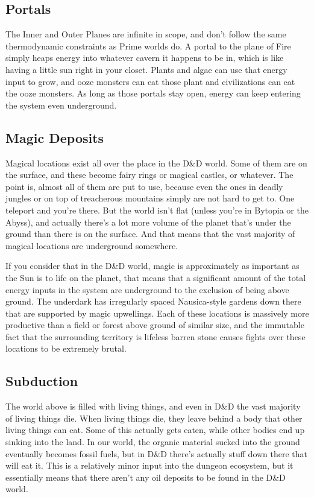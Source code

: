 \subsection{Portals}

The Inner and Outer Planes are infinite in scope, and don't follow the same thermodynamic constraints as Prime worlds do. A portal to the plane of Fire simply heaps energy into whatever cavern it happens to be in, which is like having a little sun right in your closet. Plants and algae can use that energy input to grow, and ooze monsters can eat those plant and civilizations can eat the ooze monsters. As long as those portals stay open, energy can keep entering the system even underground.

\subsection{Magic Deposits}

Magical locations exist all over the place in the D\&D world. Some of them are on the surface, and these become fairy rings or magical castles, or whatever. The point is, almost all of them are put to use, because even the ones in deadly jungles or on top of treacherous mountains simply are not hard to get to. One teleport and you're there. But the world isn't flat (unless you're in Bytopia or the Abyss), and actually there's a lot more volume of the planet that's under the ground than there is on the surface. And that means that the vast majority of magical locations are underground somewhere.

If you consider that in the D\&D world, magic is approximately as important as the Sun is to life on the planet, that means that a significant amount of the total energy inputs in the system are underground to the exclusion of being above ground. The underdark has irregularly spaced Nausica-style gardens down there that are supported by magic upwellings. Each of these locations is massively more productive than a field or forest above ground of similar size, and the immutable fact that the surrounding territory is lifeless barren stone causes fights over these locations to be extremely brutal.

\subsection{Subduction}

The world above is filled with living things, and even in D\&D the vast majority of living things die. When living things die, they leave behind a body that other living things can eat. Some of this actually gets eaten, while other bodies end up sinking into the land. In our world, the organic material sucked into the ground eventually becomes fossil fuels, but in D\&D there's actually stuff down there that will eat it. This is a relatively minor input into the dungeon ecosystem, but it essentially means that there aren't any oil deposits to be found in the D\&D world.

